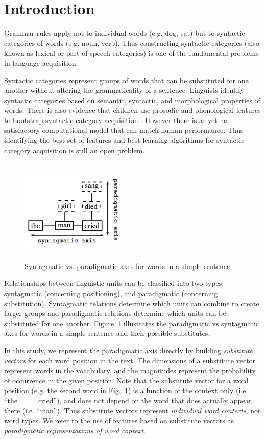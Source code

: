\section{Introduction}
\label{sec:intro}

Grammar rules apply not to individual words (e.g. dog, eat) but to
syntactic categories of words (e.g. noun, verb).  Thus constructing
syntactic categories (also known as lexical or part-of-speech
categories) is one of the fundamental problems in language
acquisition.

Syntactic categories represent groups of words that can be substituted
for one another without altering the grammaticality of a sentence.
Linguists identify syntactic categories based on semantic, syntactic,
and morphological properties of words.  There is also evidence that
children use prosodic and phonological features to bootstrap syntactic
category acquisition \cite{ambridge2011child}.  However there is as
yet no satisfactory computational model that can match human
performance.  Thus identifying the best set of features and best
learning algorithms for syntactic category acquisition is still an
open problem.

\begin{figure}[b] 
  \centering
  \includegraphics[height=50mm,width=50mm]{paradigmatic.png}
  \caption{Syntagmatic vs. paradigmatic axes for words in a simple
    sentence \protect\cite{chandler2007semiotics}.}
  \label{fig:paradigmatic}
\end{figure}

Relationships between linguistic units can be classified into two
types: syntagmatic (concerning positioning), and paradigmatic
(concerning substitution).  Syntagmatic relations determine which
units can combine to create larger groups and paradigmatic relations
determine which units can be substituted for one another.
Figure~\ref{fig:paradigmatic} illustrates the paradigmatic vs
syntagmatic axes for words in a simple sentence and their possible
substitutes.  

In this study, we represent the paradigmatic axis directly by building
{\em substitute vectors} for each word position in the text.  The
dimensions of a substitute vector represent words in the vocabulary,
and the magnitudes represent the probability of occurrence in the given
position.  Note that the substitute vector for a word position (e.g.
the second word in Fig.~\ref{fig:paradigmatic}) is a function of the
context only (i.e. ``the \_\_\_ cried''), and does not depend on the
word that does actually appear there (i.e. ``man'').  Thus substitute
vectors represent {\em individual word contexts}, not word types.  We
refer to the use of features based on substitute vectors as 
{\em paradigmatic representations of word context}.

